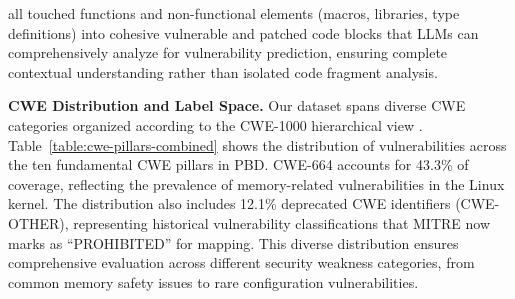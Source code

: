 \documentclass[lettersize,journal]{IEEEtran}
\begin{document}
all touched functions and non-functional elements (macros, libraries, type definitions) into cohesive vulnerable and patched code blocks that LLMs can comprehensively analyze for vulnerability prediction, ensuring complete contextual understanding rather than isolated code fragment analysis.

\textbf{\gls{CWE} Distribution and Label Space.} Our dataset spans diverse \gls{CWE} categories organized according to the CWE-1000 hierarchical view \cite{cwe1000}. Table~\ref{table:cwe-pillars-combined} shows the distribution of vulnerabilities across the ten fundamental \gls{CWE} pillars in PBD. CWE-664 accounts for 43.3\% of coverage, reflecting the prevalence of memory-related vulnerabilities in the Linux kernel. The distribution also includes 12.1\% deprecated \gls{CWE} identifiers (CWE-OTHER), representing historical vulnerability classifications that MITRE now marks as \enquote{PROHIBITED} for mapping. This diverse distribution ensures comprehensive evaluation across different security weakness categories, from common memory safety issues to rare configuration vulnerabilities.

\begin{table}[!t]
\centering
\caption{LLMKernelBench dataset statistics}
\label{table:dataset-stats}
\scriptsize
\setlength{\tabcolsep}{22pt}
\renewcommand{\arraystretch}{1.1}
\end{table}
\end{document}
